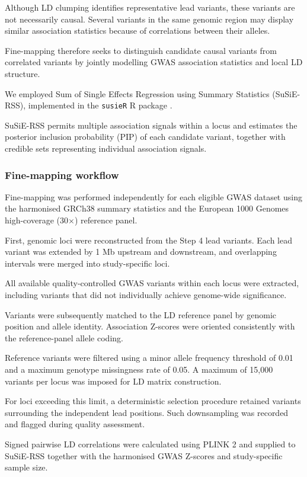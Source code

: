 \documentclass[11pt,a4paper]{article}
\begin{document}
Although LD clumping identifies representative lead
variants, these variants are not necessarily causal.
Several variants in the same genomic region may display
similar association statistics because of correlations
between their alleles.

Fine-mapping therefore seeks to distinguish candidate
causal variants from correlated variants by jointly
modelling GWAS association statistics and local LD
structure.

We employed Sum of Single Effects Regression using
Summary Statistics (SuSiE-RSS), implemented in the
\texttt{susieR} R package \cite{Zou2022,Wang2020}.

SuSiE-RSS permits multiple association signals within
a locus and estimates the posterior inclusion probability
(PIP) of each candidate variant, together with
credible sets representing individual association signals.

\subsubsection{Fine-mapping workflow}

Fine-mapping was performed independently for each
eligible GWAS dataset using the harmonised GRCh38
summary statistics and the European 1000 Genomes
high-coverage (30$\times$) reference panel.

First, genomic loci were reconstructed from the Step 4
lead variants. Each lead variant was extended by
1 Mb upstream and downstream, and overlapping
intervals were merged into study-specific loci.

All available quality-controlled GWAS variants within
each locus were extracted, including variants that did
not individually achieve genome-wide significance.

Variants were subsequently matched to the LD reference
panel by genomic position and allele identity.
Association Z-scores were oriented consistently with
the reference-panel allele coding.

Reference variants were filtered using a minor allele
frequency threshold of 0.01 and a maximum genotype
missingness rate of 0.05. A maximum of 15,000 variants
per locus was imposed for LD matrix construction.

For loci exceeding this limit, a deterministic selection
procedure retained variants surrounding the independent
lead positions. Such downsampling was recorded and
flagged during quality assessment.

Signed pairwise LD correlations were calculated using
PLINK 2 and supplied to SuSiE-RSS together with the
harmonised GWAS Z-scores and study-specific sample size.
\end{document}
